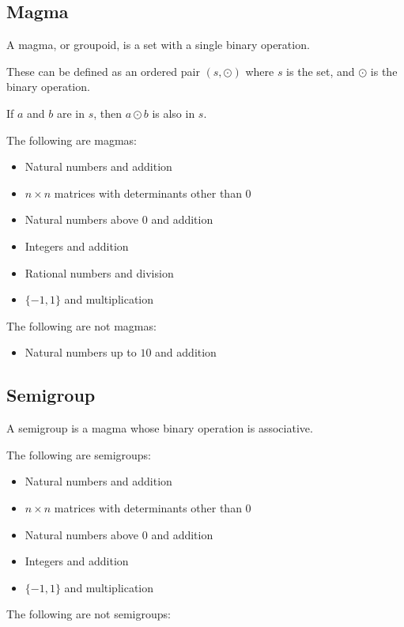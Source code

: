 
\subsection{Magma}

A magma, or groupoid, is a set with a single binary operation.

These can be defined as an ordered pair \((s,\odot )\) where \(s\) is the set, and \(\odot \) is the binary operation.

If \(a\) and \(b\) are in \(s\), then \(a\odot b\) is also in \(s\).

The following are magmas:

\begin{itemize}
\item Natural numbers and addition
\item \(n\times n\) matrices with determinants other than \(0\)
\item Natural numbers above \(0\) and addition
\item Integers and addition
\item Rational numbers and division
\item \(\{-1, 1\}\) and multiplication
\end{itemize}

The following are not magmas:

\begin{itemize}
\item Natural numbers up to \(10\) and addition
\end{itemize}

\subsection{Semigroup}

A semigroup is a magma whose binary operation is associative.

The following are semigroups:

\begin{itemize}
\item Natural numbers and addition
\item \(n\times n\) matrices with determinants other than \(0\)
\item Natural numbers above \(0\) and addition
\item Integers and addition
\item \(\{-1, 1\}\) and multiplication
\end{itemize}

The following are not semigroups:

